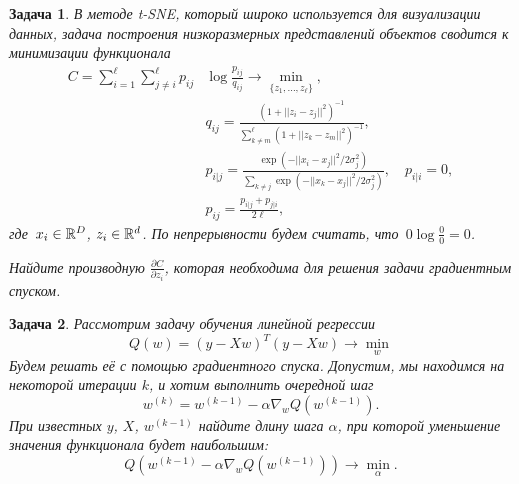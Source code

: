 \documentclass[12pt,fleqn]{article}
\newtheorem{esProblem}{Задача}
\begin{document}
\begin{esProblem}
    В методе t-SNE, который широко используется для визуализации данных,
    задача построения низкоразмерных представлений объектов
    сводится к минимизации функционала
    \begin{align*}
        C = \sum_{i = 1}^{\ell} \sum_{j \neq i}^{\ell} p_{ij} &\log\frac{p_{ij}}{q_{ij}} \rightarrow \min_{\{z_1, \dots, z_\ell\}}, \\
        &q_{ij} = \frac{(1 + ||z_i - z_j||^2)^{-1}}{\sum_{k \neq m}^\ell (1 + ||z_k - z_m||^2)^{-1}}, \\
        &p_{i|j} = \frac{\exp(-||x_i - x_j||^2 / 2\sigma_j^2)}{\sum_{k \neq j}\exp(-||x_k - x_j||^2 / 2\sigma_j^2)}, \quad p_{i|i} = 0, \\
        &p_{ij} = \frac{p_{i|j} + p_{j|i}}{2\ell},
    \end{align*}
    где~$x_i \in \mathbb{R}^D$, $z_i \in \mathbb{R}^d$.
    По непрерывности будем считать, что~$0 \log \frac{0}{0} = 0$.

    Найдите производную $\frac{\partial C}{\partial z_i}$, которая необходима для решения задачи градиентным спуском.
\end{esProblem}


\begin{esProblem}

    Рассмотрим задачу обучения линейной регрессии
    \begin{equation*}
        Q(w) = (y - Xw)^T(y - Xw) \rightarrow \min_{w}
    \end{equation*}
    Будем решать её с помощью градиентного спуска. Допустим, мы находимся на некоторой итерации $k$,
    и хотим выполнить очередной шаг
    \begin{equation*}
        w^{(k)} = w^{(k-1)} - \alpha \nabla_w Q(w^{(k - 1)}).
    \end{equation*}
    При известных $y$, $X$, $w^{(k-1)}$ найдите длину шага $\alpha$, при которой уменьшение значения функционала будет наибольшим:
    \[
        Q(w^{(k - 1)} - \alpha \nabla_w Q(w^{(k - 1)})) \to \min_{\alpha}.
    \]
\end{esProblem}
\end{document}
